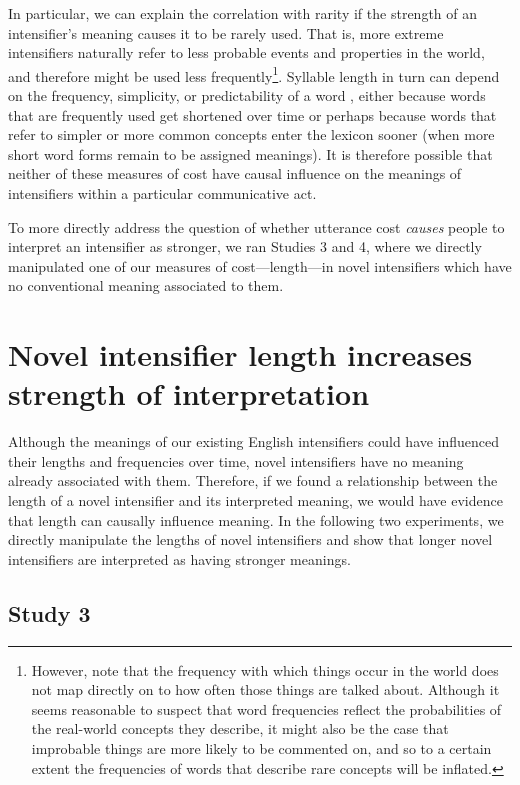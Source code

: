 \documentclass[10pt,letterpaper]{article}
\begin{document}
In particular, we can explain the correlation with rarity if the strength of an intensifier's meaning causes it to be rarely used.
That is, more extreme intensifiers naturally refer to less probable events and properties in the world, and therefore might be used less frequently\footnote{
However, note that the frequency with which things occur in the world does not map directly on to how often those things are talked about. 
Although it seems reasonable to suspect that word frequencies reflect the probabilities of the real-world concepts they describe, it might also be the case that improbable things are more likely to be commented on, and so to a certain extent the frequencies of words that describe rare concepts will be inflated. 
}.
Syllable length in turn can depend on the frequency, simplicity, or predictability of a word \cite{zipf_psycho-biology_1935, lewis_conceptual_2016, mahowald_info/information_2013}, either because words that are frequently used get shortened over time \cite{kanwal_evolution_2016} or perhaps because words that refer to simpler or more common concepts enter the lexicon sooner (when more short word forms remain to be assigned meanings).
It is therefore possible that neither of these measures of cost have causal influence on the meanings of intensifiers within a particular communicative act.

To more directly address the question of whether utterance cost \emph{causes} people to interpret an intensifier as stronger, we ran Studies 3 and 4, where we directly manipulated one of our measures of cost---length---in novel intensifiers which have no conventional meaning associated to them. 

\section{Novel intensifier length increases strength of interpretation}

Although the meanings of our existing English intensifiers could have influenced their lengths and frequencies over time, novel intensifiers have no meaning already associated with them. Therefore, if we found a relationship between the length of a novel intensifier and its interpreted meaning, we would have evidence that length can causally influence meaning. In the following two experiments, we directly manipulate the lengths of novel intensifiers and show that longer novel intensifiers are interpreted as having stronger meanings.

\subsection{Study 3 \label{sec:study3}}
\end{document}
